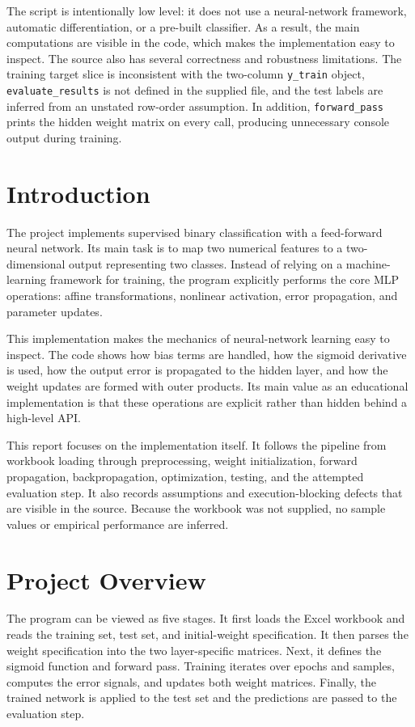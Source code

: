 \documentclass[11pt,a4paper]{article}
\newcommand{\code}[1]{\texttt{\small #1}}
\begin{document}
The script is intentionally low level: it does not use a neural-network framework, automatic differentiation, or a pre-built classifier. As a result, the main computations are visible in the code, which makes the implementation easy to inspect. The source also has several correctness and robustness limitations. The training target slice is inconsistent with the two-column \code{y\_train} object, \code{evaluate\_results} is not defined in the supplied file, and the test labels are inferred from an unstated row-order assumption. In addition, \code{forward\_pass} prints the hidden weight matrix on every call, producing unnecessary console output during training.

\section{Introduction}
The project implements supervised binary classification with a feed-forward neural network. Its main task is to map two numerical features to a two-dimensional output representing two classes. Instead of relying on a machine-learning framework for training, the program explicitly performs the core MLP operations: affine transformations, nonlinear activation, error propagation, and parameter updates.

This implementation makes the mechanics of neural-network learning easy to inspect. The code shows how bias terms are handled, how the sigmoid derivative is used, how the output error is propagated to the hidden layer, and how the weight updates are formed with outer products. Its main value as an educational implementation is that these operations are explicit rather than hidden behind a high-level API.

This report focuses on the implementation itself. It follows the pipeline from workbook loading through preprocessing, weight initialization, forward propagation, backpropagation, optimization, testing, and the attempted evaluation step. It also records assumptions and execution-blocking defects that are visible in the source. Because the workbook was not supplied, no sample values or empirical performance are inferred.

\section{Project Overview}
The program can be viewed as five stages. It first loads the Excel workbook and reads the training set, test set, and initial-weight specification. It then parses the weight specification into the two layer-specific matrices. Next, it defines the sigmoid function and forward pass. Training iterates over epochs and samples, computes the error signals, and updates both weight matrices. Finally, the trained network is applied to the test set and the predictions are passed to the evaluation step.
\end{document}

